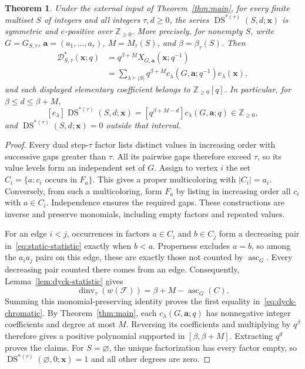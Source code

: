 \documentclass[11pt]{article}
\newtheorem{theorem}{Theorem}[section]
\theoremstyle{remark}
\newcommand{\NN}{\mathbb Z_{\geq 0}}
\newcommand{\xx}{\mathbf x}
\newcommand{\avec}{\mathbf a}
\DeclareMathOperator{\asc}{asc}
\DeclareMathOperator{\dinv}{dinv}
\DeclareMathOperator{\DS}{DS}
\numberwithin{equation}{section}
\begin{document}
\begin{theorem}\label{thm:dyck}
Under the external input of Theorem~\ref{thm:main}, for every finite
multiset $S$ of integers and all integers $\tau,d\geq0$, the series
$\DS^{*(\tau)}(S,d;\xx)$ is symmetric and $e$-positive over $\NN$.
More precisely, for nonempty $S$, write $G=G_{S,\tau}$,
$\avec=(a_1,\ldots,a_r)$, $M=M_\tau(S)$, and $\beta=\beta_\tau(S)$.
Then
\begin{equation}\label{eq:dyck-chromatic}
 \begin{aligned}
 \mathcal D^*_{S,\tau}(\xx;q)
   &=q^{\beta+M}X_{G,\avec}(\xx;q^{-1})\\
   &=\sum_{\lambda\vdash |S|}
       q^{\beta+M}c_\lambda(G,\avec;q^{-1})e_\lambda(\xx),
 \end{aligned}
\end{equation}
and each displayed elementary coefficient belongs to $\NN[q]$.
In particular, for $\beta\leq d\leq\beta+M$,
\begin{equation}\label{eq:dyck-coefficient}
 [e_\lambda]\DS^{*(\tau)}(S,d;\xx)
    =[q^{\beta+M-d}]c_\lambda(G,\avec;q)\in\NN,
\end{equation}
and $\DS^{*(\tau)}(S,d;\xx)=0$ outside that interval.
\end{theorem}
\begin{proof}
Every dual step-$\tau$ factor lists distinct values in increasing order
with successive gaps greater than $\tau$. All its pairwise gaps
therefore exceed $\tau$, so its value levels form an independent set of $G$.
Assign to vertex $i$ the set
$C_i=\{a:c_i\text{ occurs in }F_a\}$. This gives a proper
multicoloring with $|C_i|=a_i$. Conversely, from such a multicoloring,
form $F_a$ by listing in increasing order all $c_i$ with $a\in C_i$.
Independence ensures the required gaps. These constructions are inverse
and preserve monomials, including empty factors and repeated values.

For an edge $i<j$, occurrences in factors $a\in C_i$ and $b\in C_j$
form a decreasing pair in~\eqref{eq:static-statistic} exactly when
$b<a$. Properness excludes $a=b$, so among the $a_i a_j$ pairs on
this edge, these are exactly those not counted by $\asc_G$. Every
decreasing pair counted there comes from an edge. Consequently,
Lemma~\ref{lem:dyck-statistic} gives
\[
 \dinv_\tau(w(\mathcal F))=\beta+M-\asc_G(C).
\]
Summing this monomial-preserving identity proves the first equality
in~\eqref{eq:dyck-chromatic}. By Theorem~\ref{thm:main}, each
$c_\lambda(G,\avec;q)$ has nonnegative integer coefficients and
degree at most $M$. Reversing its coefficients and multiplying by
$q^\beta$ therefore gives a positive polynomial supported in
$[\beta,\beta+M]$. Extracting $q^d$ proves the claims. For $S=\varnothing$,
the unique factorization has every factor empty, so
$\DS^{*(\tau)}(\varnothing,0;\xx)=1$ and all other degrees are zero.
\end{proof}
\end{document}
